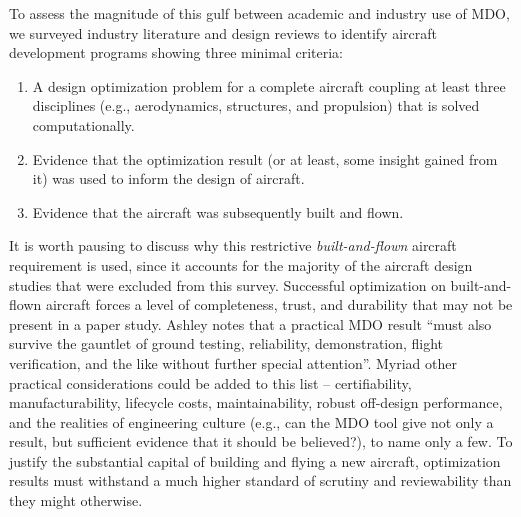 \documentclass[12pt,vi,oneside,table]{report}
\begin{document}
    To assess the magnitude of this gulf between academic and industry use of MDO, we surveyed industry literature and design reviews to identify aircraft development programs showing three minimal criteria:
    \begin{enumerate}[noitemsep]
        \item A design optimization problem for a complete aircraft coupling at least three disciplines (e.g., aerodynamics, structures, and propulsion) that is solved computationally.
        \item Evidence that the optimization result (or at least, some insight gained from it) was used to inform the design of aircraft.
        \item Evidence that the aircraft was subsequently built and flown.
    \end{enumerate}

    \noindent It is worth pausing to discuss why this restrictive \textit{built-and-flown} aircraft requirement is used, since it accounts for the majority of the aircraft design studies that were excluded from this survey. Successful optimization on built-and-flown aircraft forces a level of completeness, trust, and durability that may not be present in a paper study. Ashley notes that a practical MDO result ``must also survive the gauntlet of ground testing, reliability, demonstration, flight verification, and the like without further special attention''. \cite{ashley_making_1982} Myriad other practical considerations could be added to this list -- certifiability, manufacturability, lifecycle costs, maintainability, robust off-design performance, and the realities of engineering culture (e.g., can the MDO tool give not only a result, but sufficient evidence that it should be believed?), to name only a few. To justify the substantial capital of building and flying a new aircraft, optimization results must withstand a much higher standard of scrutiny and reviewability than they might otherwise.

\end{document}
